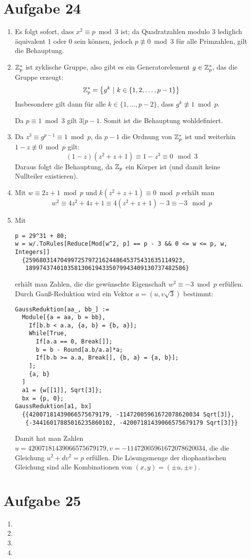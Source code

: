 \section*{Aufgabe 24}
\begin{enumerate}[(1)]
	\item Es folgt sofort, dass $x^2 \equiv p\bmod 3$ ist; da Quadratzahlen
	modulo $3$ lediglich äquivalent $1$ oder $0$ sein können, jedoch $p
	\not\equiv 0\bmod 3$ für alle Primzahlen, gilt die Behauptung.
	
	\item $\mathbb{Z}_p^*$ ist zyklische Gruppe, also gibt es ein Generatorelement
	$g \in \mathbb{Z}_p^*$, das die Gruppe erzeugt:
	\[ \mathbb{Z}_p^* = \left\{g^k\ \vert\ k \in \{1,2,\dots,p-1\}\right\} \]
	Insbesondere gilt dann für alle $k \in \{1,\dots,p-2\}$, dass $g^k
	\not\equiv 1\bmod p$.

	Da $p \equiv 1\bmod 3$ gilt $3 \vert p-1$. Somit ist die Behauptung
	wohldefiniert.

	\item Da $z^3 \equiv g^{p-1} \equiv 1\bmod p$, da $p-1$ die Ordnung von
	$\mathbb{Z}_p^*$ ist und weiterhin $1-z \not\equiv 0\bmod p$ gilt:
	\[ (1-z)(z^2+z+1) \equiv 1-z^3 \equiv 0\mod 3\]
	Daraus folgt die Behauptung, da $\mathbb{Z}_p$ ein Körper ist (und damit keine
	Nullteiler existieren).

	\item Mit $w \equiv 2 z + 1 \bmod p$ und $k ( z^2 + z + 1) \equiv 0 \bmod p$ erhält man
	\[ w^2 \equiv 4 z^2 + 4 z + 1 \equiv 4 (z^2 + z + 1) - 3 \equiv -3 \mod p\]

	\item Mit 
	\begin{lstlisting}
p = 29^31 + 80;
w = w/.ToRules[Reduce[Mod[w^2, p] == p - 3 && 0 <= w <= p, w, Integers]]
  {259680314704997257972162448645375431635114923,
   1899743740103581306194335079943409130737482586}
	\end{lstlisting}
	erhält man Zahlen, die die gewünschte Eigenschaft $w^2 \equiv -3 \bmod
	p$ erfüllen.
	Durch Gauß-Reduktion wird ein Vektor $a = (u, v \sqrt{3})$ bestimmt:
\begin{lstlisting}
GaussReduktion[aa_, bb_] := 
  Module[{a = aa, b = bb}, 
    If[b.b < a.a, {a, b} = {b, a}];
    While[True,
      If[a.a == 0, Break[]];
      b = b - Round[a.b/a.a]*a;
      If[b.b >= a.a, Break[], {b, a} = {a, b}];
    ];
    {a, b}
  ]
  a1 = {w[[1]], Sqrt[3]};
  bx = {p, 0};
GaussReduktion[a1, bx]
  {{42007181439066575679179, -11472005961672078620034 Sqrt[3]}, 
   {-34416017885016235860102, -42007181439066575679179 Sqrt[3]}}
\end{lstlisting}
	Damit hat man Zahlen $u = 42007181439066575679179, v =
	-11472005961672078620034$, die die Gleichung $u^2 + d v^2 = p$
	erfüllen. Die Lösungsmenge der diophantischen Gleichung sind alle
	Kombinationen von $(x,y) = (\pm u, \pm v)$.
\end{enumerate}

\section*{Aufgabe 25}
\begin{enumerate}[(1)]
	\item 
	\item 
	\item
	\item
\end{enumerate}
